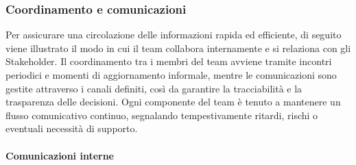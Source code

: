 \documentclass[a4paper,12pt]{article}
\begin{document}
            
        \subsubsection{Coordinamento e comunicazioni}
            Per assicurare una circolazione delle informazioni rapida ed efficiente, di seguito viene illustrato il modo in cui il team collabora internamente e si relaziona con gli Stakeholder. Il coordinamento tra i membri del team avviene tramite incontri periodici e momenti di aggiornamento informale, mentre le comunicazioni sono gestite attraverso i canali definiti, così da garantire la tracciabilità e la trasparenza delle decisioni. Ogni componente del team è tenuto a mantenere un flusso comunicativo continuo, segnalando tempestivamente ritardi, rischi o eventuali necessità di supporto.

            \paragraph{Comunicazioni interne}\hfill{}
\end{document}
